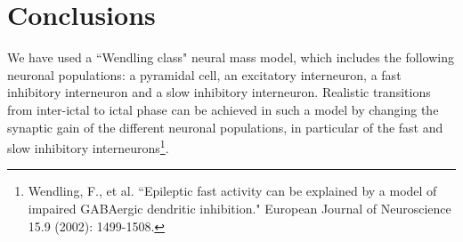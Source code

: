\documentclass[11pt,a4,oneside]{amsart}
\begin{document}
\section{Conclusions}
We have used a ``Wendling class" neural mass model, which includes the following neuronal populations: a pyramidal cell, an excitatory interneuron, a fast inhibitory interneuron and a slow inhibitory interneuron. Realistic transitions from inter-ictal to ictal phase can be achieved in such a model by changing the synaptic gain of the different neuronal populations, in particular of the fast and slow inhibitory interneurons\footnote{Wendling, F., et al. ``Epileptic fast activity can be explained by a model of impaired GABAergic dendritic inhibition." European Journal of Neuroscience 15.9 (2002): 1499-1508.}. 

 
\clearpage
\end{document}
